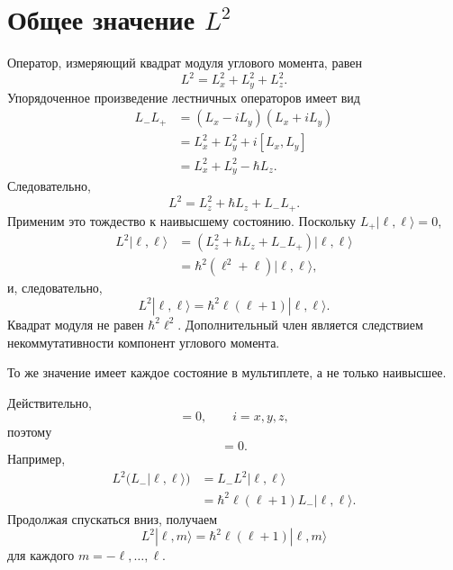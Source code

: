 \section{Общее значение \texorpdfstring{\(L^2\)}{L в квадрате}}

Оператор, измеряющий квадрат модуля углового момента, равен
\begin{equation}
L^2=L_x^2+L_y^2+L_z^2.
\end{equation}
Упорядоченное произведение лестничных операторов имеет вид
\begin{align}
L_-L_+
&=(L_x-iL_y)(L_x+iL_y) \\
&=L_x^2+L_y^2+i[L_x,L_y] \\
&=L_x^2+L_y^2-\hbar L_z.
\end{align}
Следовательно,
\begin{equation}
L^2=L_z^2+\hbar L_z+L_-L_+.
\end{equation}
Применим это тождество к наивысшему состоянию. Поскольку \(L_+|\ell,\ell\rangle=0\),
\begin{align}
L^2|\ell,\ell\rangle
&=\left(L_z^2+\hbar L_z+L_-L_+\right)|\ell,\ell\rangle \\
&=\hbar^2\left(\ell^2+\ell\right)|\ell,\ell\rangle,
\end{align}
и, следовательно,
\begin{equation}
L^2|\ell,\ell\rangle
=\hbar^2\ell(\ell+1)|\ell,\ell\rangle.
\end{equation}
Квадрат модуля не равен \(\hbar^2\ell^2\). Дополнительный член является следствием некоммутативности компонент углового момента.

То же значение имеет каждое состояние в мультиплете, а не только наивысшее.

\begin{classroomqa}
\end{classroomqa}

Действительно,
\begin{equation}
[L^2,L_i]=0,
\qquad i=x,y,z,
\end{equation}
поэтому
\begin{equation}
[L^2,L_\pm]=0.
\end{equation}
Например,
\begin{align}
L^2\bigl(L_-|\ell,\ell\rangle\bigr)
&=L_-L^2|\ell,\ell\rangle \\
&=\hbar^2\ell(\ell+1)L_-|\ell,\ell\rangle.
\end{align}
Продолжая спускаться вниз, получаем
\begin{equation}
L^2|\ell,m\rangle
=\hbar^2\ell(\ell+1)|\ell,m\rangle
\end{equation}
для каждого \(m=-\ell,\ldots,\ell\).

